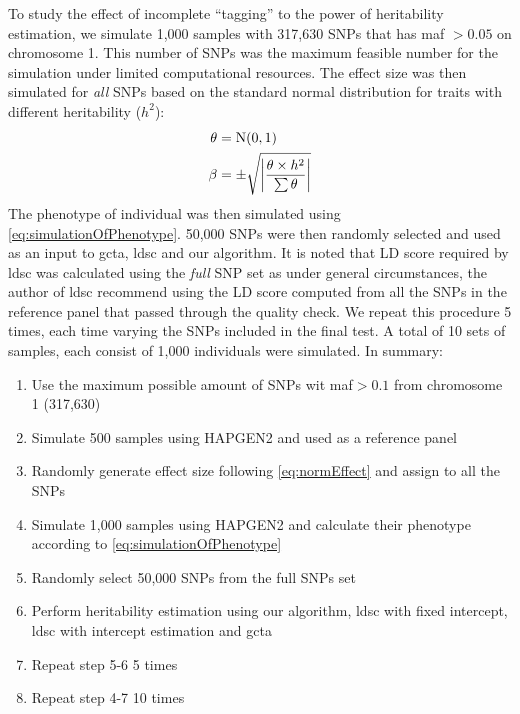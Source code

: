 		To study the effect of incomplete ``tagging'' to the power of heritability estimation, we simulate 1,000 samples with 317,630 \glspl{SNP} that has \gls{maf} $>0.05$ on chromosome 1.
		This number of \glspl{SNP} was the maximum feasible number for the simulation under limited computational resources.
		The effect size was then simulated for \emph{all} \glspl{SNP} based on the standard normal distribution for traits with different heritability ($h^2$):
		\begin{align}
		\theta&=\mathrm{N}(0,1)\notag\\
		\beta&=\pm\sqrt{\left|\frac{\theta \times h^2}{\sum \theta}\right|}
		\label{eq:normEffect}
		\end{align}
		The phenotype of individual was then simulated using \cref{eq:simulationOfPhenotype}.
		50,000 \glspl{SNP} were then randomly selected and used as an input to \gls{gcta}, \gls{ldsc} and our algorithm.
		It is noted that \gls{LD} score required by \gls{ldsc} was calculated using the \emph{full} \gls{SNP} set as under general circumstances, the author of \gls{ldsc} recommend using the \gls{LD} score computed from all the \glspl{SNP} in the reference panel that passed through the quality check.
		We repeat this procedure 5 times, each time varying the \glspl{SNP} included in the final test.
		A total of 10 sets of samples, each consist of 1,000 individuals were simulated.
		In summary:
		\begin{enumerate}
			\item Use the maximum possible amount of \glspl{SNP} wit \gls{maf}$>0.1$ from chromosome 1 (317,630)
			\item Simulate 500 samples using HAPGEN2 and used as a reference panel
			\item Randomly generate effect size following \cref{eq:normEffect} and assign to all the \glspl{SNP}
			\item Simulate 1,000 samples using HAPGEN2 and calculate their phenotype according to \cref{eq:simulationOfPhenotype}
			\item Randomly select 50,000 \glspl{SNP} from the full \glspl{SNP} set
			\item Perform heritability estimation using our algorithm, \gls{ldsc} with fixed intercept, \gls{ldsc} with intercept estimation and \gls{gcta}
			\item Repeat step 5-6 5 times
			\item Repeat step 4-7 10 times
		\end{enumerate}
		
